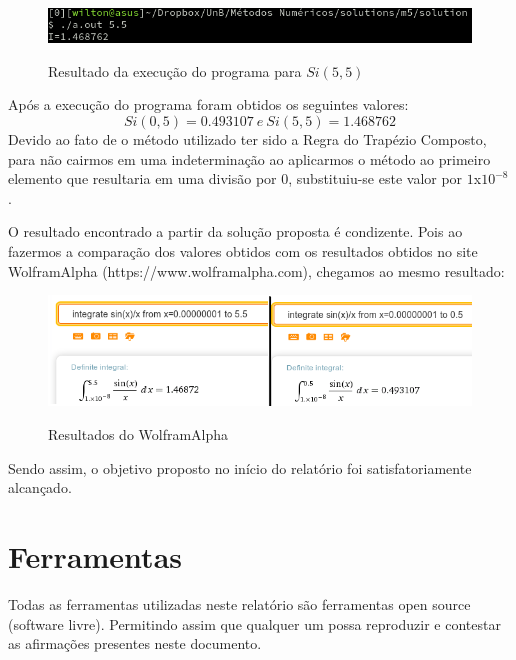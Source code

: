 \documentclass[12pt, hidelinks]{article}
\begin{document}
\begin{figure}[!h]
  \centering
  \includegraphics[width=15cm]{figuras/si55.png}\\
  \caption{Resultado da execução do programa para $Si(5,5)$}\label{fig:printro27}
\end{figure}
Após a execução do programa foram obtidos os seguintes valores:
$$Si(0,5) = 0.493107~e~Si(5,5) = 1.468762$$
Devido ao fato de o método utilizado ter sido a Regra do Trapézio Composto, para não cairmos em uma indeterminação ao aplicarmos o método ao primeiro elemento que resultaria em uma divisão por $0$, substituiu-se este valor por $1$x$10^{-8}$.

O resultado encontrado a partir da solução proposta é condizente. Pois ao fazermos a comparação dos valores obtidos com os resultados obtidos no site WolframAlpha (https://www.wolframalpha.com), chegamos ao mesmo resultado:

\begin{figure}[!h]
  \centering
  \includegraphics[width=15cm]{figuras/wolf.png}\\
  \caption{Resultados do WolframAlpha}
  \label{fig:w05}
\end{figure}

Sendo assim, o objetivo proposto no início do relatório foi satisfatoriamente alcançado.

\newpage
\section{Ferramentas}
Todas as ferramentas utilizadas neste relatório são ferramentas open source (software livre).
Permitindo assim que qualquer um possa reproduzir e contestar as afirmações presentes neste documento.
\end{document}

